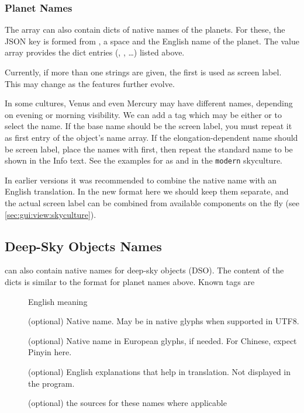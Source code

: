 \subsubsection{Planet Names}
\label{sec:skycultures:planetnames}

The   array can also contain dicts of native names of the planets. 
For these, the JSON key is formed from , a space and the English name of the planet. 
The value array provides the dict entries (, , \ldots) listed above. 

Currently, if more than one  strings are given, the first is used as screen label. This may change as the features further evolve.

In some cultures, Venus and even Mercury may have different names, depending on evening or morning visibility. 
We can add a tag  which may be either  or  to select the name. 
If the base name should be the screen label, you must repeat it as first entry of the object's  name array. 
If the elongation-dependent name should be screen label, place the names with  first, then repeat the 
standard name to be shown in the Info text. 
See the examples for  as  and  in the \texttt{modern} skyculture.

In earlier versions it was recommended to combine the native name with an English translation. 
In the new format here we should keep them separate, and the actual screen label can be combined from available 
components on the fly (see \ref{sec:gui:view:skyculture}).



\subsection{Deep-Sky Objects Names}
\label{sec:skycultures:dsonames}

 can also contain native names for
deep-sky objects (DSO). The content  of the dicts is similar to the 
format for planet names above. %
Known tags are 
\begin{description}
\item[] English meaning
\item[] (optional) Native name. May be in native glyphs when supported in UTF8.
\item[] (optional) Native name in European glyphs, if needed. For Chinese, expect Pinyin here.
\item[] (optional) English explanations that help in translation. Not displayed in the program.
\item[]  (optional) the sources for these names where applicable
\end{description}

